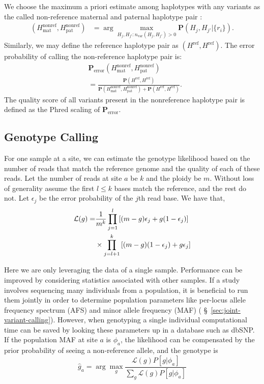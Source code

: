 \documentclass{acm_proc_article-sp}
\begin{document}
We choose the maximum a priori estimate among haplotypes with any variants
as the called non-reference maternal and paternal haplotype pair \cite{albers11}:
\begin{align}
  (H_\text{mat}^\text{nonref},H_\text{pat}^\text{nonref})&=\arg\max_{H_j,H_{j'}:n_\text{var}(H_j,H_{j'})>0}\mathbf P(H_j,H_{j'}|\{r_i\}).
\end{align}
Similarly, we may define the reference haplotype pair as
$(H^\text{ref},H^\text{ref})$.
The error probability of calling the non-reference haplotype pair is:
\begin{align}
  &\mathbf P_\text{error}(H_\text{mat}^\text{nonref},H_\text{pat}^\text{nonref}) \\ \nonumber
  &=\frac{\mathbf P(H^\text{ref},H^\text{ref})}{\mathbf P(H_\text{mat}^\text{nonref},H_\text{pat}^\text{nonref})+\mathbf P(H^\text{ref},H^\text{ref})}.
\end{align}
The quality score of all variants present in the nonreference haplotype pair
is defined as the Phred scaling of $\mathbf P_\text{error}$.

\subsection{Genotype Calling}
\label{sec:snp-calling}

For one sample at a site, we can estimate the genotype likelihood based on the number of reads that match the
reference genome and the quality of each of these reads. Let the number of reads at site $a$ be $k$ and the ploidy be $m$. Without
loss of generality assume the first $l\leq k$ bases match the reference, and the rest do not. Let $\epsilon_j$ be the
error probability of the $j$th read base. We have that,
\begin{align}
\mathcal{L}(g) =& \frac{1}{m^k} \prod_{j=1}^l \left[ (m-g)\epsilon_j + g( 1 - \epsilon_j )\right] \notag\\
&\times\prod_{j=l+1}^k \left[(m-g)(1-\epsilon_j) + g\epsilon_j \right]
\label{eq:likelihood}
\end{align}

Here we are only leveraging the data of a single sample. Performance can be improved by considering statistics associated
with other samples. If a study involves sequencing many individuals from a population, it is beneficial to run them jointly in order
to determine population parameters like per-locus allele frequency spectrum (AFS) and minor allele frequency (MAF)
( \S~\ref{sec:joint-variant-calling}). However, when genotyping a single individual computational time can be saved by looking
these parameters up in a database such as dbSNP. If the population MAF at site $a$ is $\phi_a$, the likelihood can be
compensated by the prior probability of seeing a non-reference allele, and the genotype is
\begin{equation}
\hat{g}_{a} = \arg\max_g \frac{\mathcal{L}(g)P[g|\phi_a]}{\sum_g \mathcal{L}(g)P[g|\phi_a]}
\end{equation}
\end{document}
